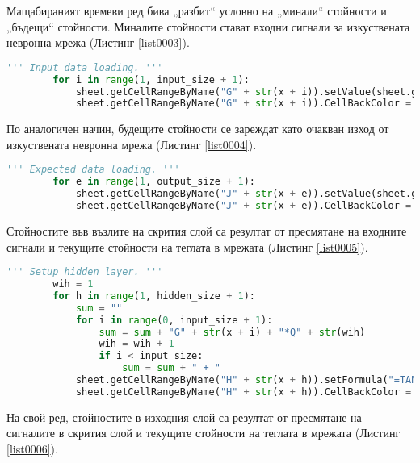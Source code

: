 Мащабираният времеви ред бива „разбит“ условно на „минали“ стойности и „бъдещи“ стойности. Миналите стойности стават входни сигнали за изкуствената невронна мрежа (Листинг \ref{list0003}).

\begin{lstlisting}[caption=Формиране на входния слой, language=Python, basicstyle=\tiny, label=list0003]
        ''' Input data loading. '''
        for i in range(1, input_size + 1):
            sheet.getCellRangeByName("G" + str(x + i)).setValue(sheet.getCellRangeByName("E" + str(t + i)).getValue())
            sheet.getCellRangeByName("G" + str(x + i)).CellBackColor = (255 << 16 | 0 << 8 | 0)
\end{lstlisting}

По аналогичен начин, будещите стойности се зареждат като очакван изход от изкуствената невронна мрежа (Листинг \ref{list0004}).

\begin{lstlisting}[caption=Очакван изход от мрежата, language=Python, basicstyle=\tiny, label=list0004]
        ''' Expected data loading. '''
        for e in range(1, output_size + 1):
            sheet.getCellRangeByName("J" + str(x + e)).setValue(sheet.getCellRangeByName("E" + str(t + e + input_size)).getValue())
            sheet.getCellRangeByName("J" + str(x + e)).CellBackColor = (0 << 16 | 127 << 8 | 0)
\end{lstlisting}

Стойностите във възлите на скрития слой са резултат от пресмятане на входните сигнали и текущите стойности на теглата в мрежата (Листинг \ref{list0005}). 

\begin{lstlisting}[caption=Стойности на скрития слой при правия пас, language=Python, basicstyle=\tiny, label=list0005]
        ''' Setup hidden layer. '''
        wih = 1
        for h in range(1, hidden_size + 1):
            sum = ""
            for i in range(0, input_size + 1):
                sum = sum + "G" + str(x + i) + "*Q" + str(wih)
                wih = wih + 1
                if i < input_size:
                    sum = sum + " + "
            sheet.getCellRangeByName("H" + str(x + h)).setFormula("=TANH( " + sum + " )")
            sheet.getCellRangeByName("H" + str(x + h)).CellBackColor = (0 << 16 | 0 << 8 | 255)
\end{lstlisting}

На свой ред, стойностите в изходния слой са резултат от пресмятане на сигналите в скрития слой и текущите стойности на теглата в мрежата (Листинг \ref{list0006}).

